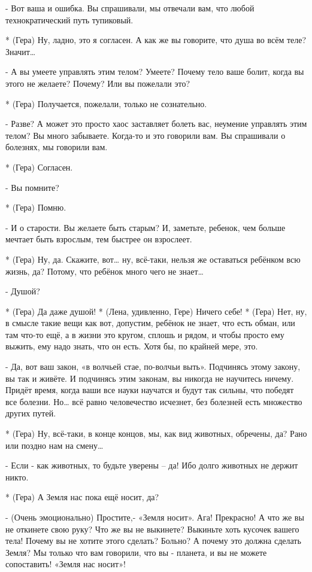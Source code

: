 - Вот ваша и ошибка. Вы спрашивали, мы отвечали вам, что любой технократический путь тупиковый.

* (Гера) Ну, ладно, это я согласен. А как же вы говорите, что душа во всём теле? Значит…

- А вы умеете управлять этим телом? Умеете? Почему тело ваше болит, когда вы этого не желаете? Почему? Или вы пожелали это?

* (Гера) Получается, пожелали, только не сознательно.

- Разве? А может это просто хаос заставляет болеть вас, неумение управлять этим телом? Вы много забываете. Когда-то и это говорили вам. Вы спрашивали о болезнях, мы говорили вам.

* (Гера) Согласен.

- Вы помните? 

* (Гера) Помню.

- И о старости. Вы желаете быть старым? И, заметьте, ребенок, чем больше мечтает быть взрослым, тем быстрее он взрослеет.

* (Гера) Ну, да. Скажите, вот… ну, всё-таки, нельзя же оставаться ребёнком всю жизнь, да?  Потому, что ребёнок много чего не знает…

- Душой?

* (Гера) Да даже душой!
* (Лена, удивленно, Гере) Ничего себе!
* (Гера) Нет, ну, в смысле такие вещи как вот, допустим, ребёнок не знает, что есть обман, или там что-то ещё, а в жизни это кругом, сплошь и рядом, и чтобы просто ему выжить, ему надо знать, что он есть. Хотя бы, по крайней мере, это.

- Да, вот ваш закон, «в волчьей стае, по-волчьи выть». Подчинясь этому закону, вы так и живёте. И подчинясь этим законам, вы никогда не научитесь ничему. Придёт время, когда ваши все науки научатся и будут так сильны, что победят все болезни. Но… всё равно человечество исчезнет, без болезней есть множество других путей.

* (Гера)  Ну, всё-таки, в конце концов, мы, как вид животных, обречены, да? Рано или поздно нам на смену…

- Если - как животных, то будьте уверены – да! Ибо долго животных не держит никто. 

* (Гера) А Земля нас пока ещё носит, да?

- (Очень эмоционально) Простите,- «Земля носит». Ага! Прекрасно! А что же вы не откинете свою руку? Что же вы не выкинете?  Выкиньте хоть кусочек вашего тела! Почему вы не хотите этого сделать? Больно? А почему это должна сделать Земля? Мы только что вам говорили, что вы - планета, и вы не можете сопоставить! «Земля нас носит»!


